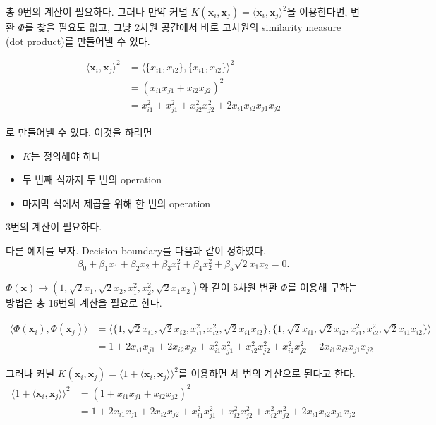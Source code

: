 \documentclass[
  letterpaper,
  DIV=11,
  numbers=noendperiod]{scrreprt}
\providecommand{\tightlist}{%
  \setlength{\itemsep}{0pt}\setlength{\parskip}{0pt}}\usepackage{longtable,booktabs,array}
\theoremstyle{definition}
\theoremstyle{plain}
\theoremstyle{definition}
\theoremstyle{definition}
\theoremstyle{remark}
\begin{document}
총 9번의 계산이 필요하다. 그러나 만약 커널
\(K(\pmb{x}_i,\pmb{x}_j)=\langle \pmb{x}_i,\pmb{x}_j\rangle^2\)을
이용한다면, 변환 \(\Phi\)를 찾을 필요도 없고, 그냥 2차원 공간에서 바로
고차원의 similarity measure (dot product)를 만들어낼 수 있다.

\begin{align*}
\langle \pmb{x}_i,\pmb{x}_j\rangle^2 &= \langle\{ x_{i1}, x_{i2}\},\{ x_{i1}, x_{i2}\} \rangle^2\\
&= (x_{i1}x_{j1} + x_{i2}x_{j2})^2\\
&= x_{i1}^2 + x_{j1}^2 + x_{i2}^2 x_{j2}^2 + 2x_{i1}x_{i2}x_{j1}x_{j2}
\end{align*}

로 만들어낼 수 있다. 이것을 하려면

\begin{itemize}
\tightlist
\item
  \(K\)는 정의해야 하나
\item
  두 번째 식까지 두 번의 operation
\item
  마지막 식에서 제곱을 위해 한 번의 operation
\end{itemize}

3번의 계산이 필요하다.

다른 예제를 보자. Decision boundary를 다음과 같이 정하였다. \[
\beta_0 + \beta_1 x_1 + \beta_2 x_2 + \beta_3 x_1^2 + \beta_4 x_2^2 + \beta_5 \sqrt{2} x_1 x_2 = 0.
\]

\(\Phi(\pmb{x}) \rightarrow (1, \sqrt{2}x_1, \sqrt{2}x_2, x_1^2, x_2^2, \sqrt{2}x_1 x_2)\)와
같이 5차원 변환 \(\Phi\)를 이용해 구하는 방법은 총 16번의 계산을 필요로
한다.

\begin{align*}
\langle \Phi(\pmb{x}_i), \Phi(\pmb{x}_j) \rangle &= \langle \{1, \sqrt{2}x_{i1}, \sqrt{2}x_{i2}, x_{i1}^2, x_{i2}^2, \sqrt{2}x_{i1}x_{i2}\}, \{1, \sqrt{2}x_{i1}, \sqrt{2}x_{i2}, x_{i1}^2, x_{i2}^2, \sqrt{2}x_{i1}x_{i2}\} \rangle\\
&= 1+ 2x_{i1}x_{j1} + 2x_{i2}x_{j2} +x_{i1}^2 x_{j1}^2 + x_{i2}^2 x_{j2}^2 +  x_{i2}^2 x_{j2}^2 + 2x_{i1}x_{i2}x_{j1}x_{j2}
\end{align*}

그러나 커널
\(K(\pmb{x}_i,\pmb{x}_j)=\langle 1+ \langle\pmb{x}_i,\pmb{x}_j\rangle\rangle^2\)를
이용하면 세 번의 계산으로 된다고 한다. \begin{align*}
\langle 1+ \langle\pmb{x}_i,\pmb{x}_j\rangle\rangle^2 &= (1+ x_{i1}x_{j1}+x_{i2}x_{j2})^2\\
&=1+ 2x_{i1}x_{j1} + 2x_{i2}x_{j2} +x_{i1}^2 x_{j1}^2 + x_{i2}^2 x_{j2}^2 +  x_{i2}^2 x_{j2}^2 + 2x_{i1}x_{i2}x_{j1}x_{j2}
\end{align*}
\end{document}
